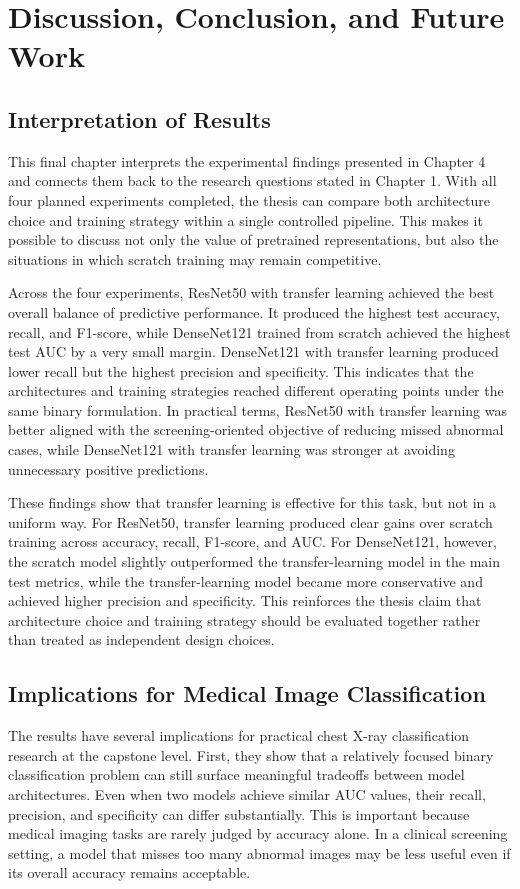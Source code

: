 \chapter{Discussion, Conclusion, and Future Work}

\section{Interpretation of Results}
This final chapter interprets the experimental findings presented in Chapter 4 and connects them back to the research questions stated in Chapter 1. With all four planned experiments completed, the thesis can compare both architecture choice and training strategy within a single controlled pipeline. This makes it possible to discuss not only the value of pretrained representations, but also the situations in which scratch training may remain competitive.

Across the four experiments, ResNet50 with transfer learning achieved the best overall balance of predictive performance. It produced the highest test accuracy, recall, and F1-score, while DenseNet121 trained from scratch achieved the highest test AUC by a very small margin. DenseNet121 with transfer learning produced lower recall but the highest precision and specificity. This indicates that the architectures and training strategies reached different operating points under the same binary formulation. In practical terms, ResNet50 with transfer learning was better aligned with the screening-oriented objective of reducing missed abnormal cases, while DenseNet121 with transfer learning was stronger at avoiding unnecessary positive predictions.

These findings show that transfer learning is effective for this task, but not in a uniform way. For ResNet50, transfer learning produced clear gains over scratch training across accuracy, recall, F1-score, and AUC. For DenseNet121, however, the scratch model slightly outperformed the transfer-learning model in the main test metrics, while the transfer-learning model became more conservative and achieved higher precision and specificity. This reinforces the thesis claim that architecture choice and training strategy should be evaluated together rather than treated as independent design choices.

\section{Implications for Medical Image Classification}
The results have several implications for practical chest X-ray classification research at the capstone level. First, they show that a relatively focused binary classification problem can still surface meaningful tradeoffs between model architectures. Even when two models achieve similar AUC values, their recall, precision, and specificity can differ substantially. This is important because medical imaging tasks are rarely judged by accuracy alone. In a clinical screening setting, a model that misses too many abnormal images may be less useful even if its overall accuracy remains acceptable.

